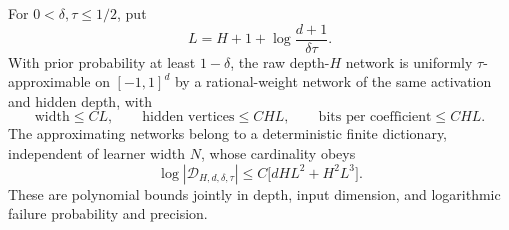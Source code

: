 \begin{theorem}
\label{thm:ard-native-compression}
For $0<\delta,\tau\le1/2$, put
\[
 L=H+1+\log\frac{d+1}{\delta\tau}.
\]
With prior probability at least $1-\delta$, the raw depth-$H$ network is uniformly $\tau$-approximable on $[-1,1]^d$ by a rational-weight network of the same activation and hidden depth, with
\[
 \text{width}\le CL,\qquad
 \text{hidden vertices}\le CHL,\qquad
 \text{bits per coefficient}\le CHL.
\]
The approximating networks belong to a deterministic finite dictionary, independent of learner width $N$, whose cardinality obeys
\[
 \log|\mathcal D_{H,d,\delta,\tau}|
 \le C\big[dH L^2+H^2L^3\big].
 \label{eq:ard-dictionary-cardinality}
\]
These are polynomial bounds jointly in depth, input dimension, and logarithmic failure probability and precision.
\end{theorem}
